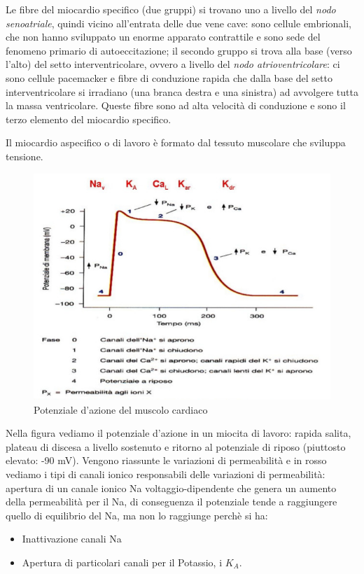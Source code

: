 \documentclass[a4paper,12pt]{article}
\begin{document}
Le fibre del miocardio specifico (due gruppi) si trovano uno a livello del \emph{nodo senoatriale}, quindi vicino all'entrata delle due vene cave: sono cellule embrionali, che non hanno sviluppato un enorme apparato contrattile e sono sede del fenomeno primario di autoeccitazione; il secondo gruppo si trova alla base (verso l'alto) del setto interventricolare, ovvero a livello del \emph{nodo atrioventricolare}: ci sono cellule pacemacker e fibre di conduzione rapida che dalla base del setto interventricolare si irradiano (una branca destra e una sinistra) ad avvolgere tutta la massa ventricolare. Queste fibre sono ad alta velocità di conduzione e sono il terzo elemento del miocardio specifico.

Il miocardio aspecifico o di lavoro è formato dal tessuto muscolare che sviluppa tensione.
\begin{figure}[H]
\centering
\includegraphics[scale=0.5]{immagine/potcard.jpg}
\caption{Potenziale d'azione del muscolo cardiaco}
\end{figure}
Nella figura vediamo il potenziale d'azione in un miocita di lavoro: rapida salita, plateau di discesa a livello sostenuto e ritorno al potenziale di riposo (piuttosto elevato: -90 mV). Vengono riassunte le variazioni di permeabilità e in rosso vediamo i tipi di canali ionico responsabili delle variazioni di permeabilità: apertura di un canale ionico Na voltaggio-dipendente che genera un aumento della permeabilità per il Na, di conseguenza il potenziale tende a raggiungere quello di equilibrio del Na, ma non lo raggiunge perchè si ha:
\begin{itemize}
\item{Inattivazione canali Na}
\item{Apertura di particolari canali per il Potassio, i $K_{A}$.}
\end{itemize}
\end{document}
